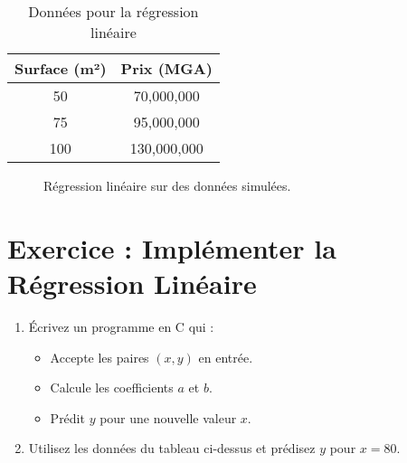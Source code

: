 \begin{table}[h]
	\centering
	\caption{Données pour la régression linéaire}
	\begin{tabular}{|c|c|}
		\hline
		Surface (m²) & Prix (MGA) \\ \hline
		50           & 70,000,000 \\ \hline
		75           & 95,000,000 \\ \hline
		100          & 130,000,000 \\ \hline
	\end{tabular}
\end{table}

\begin{figure}[h]
	\centering
	\caption{Régression linéaire sur des données simulées.}
\end{figure}

\section*{Exercice : Implémenter la Régression Linéaire}
\begin{enumerate}
	\item  Écrivez un programme en C qui :  
\begin{itemize}
	\item Accepte les paires $(x, y)$ en entrée.  
	\item Calcule les coefficients $a$ et $b$.  
	\item Prédit $y$ pour une nouvelle valeur $x$.  
\end{itemize}
\item  Utilisez les données du tableau ci-dessus et prédisez $y$ pour $x = 80$.  
\end{enumerate}

